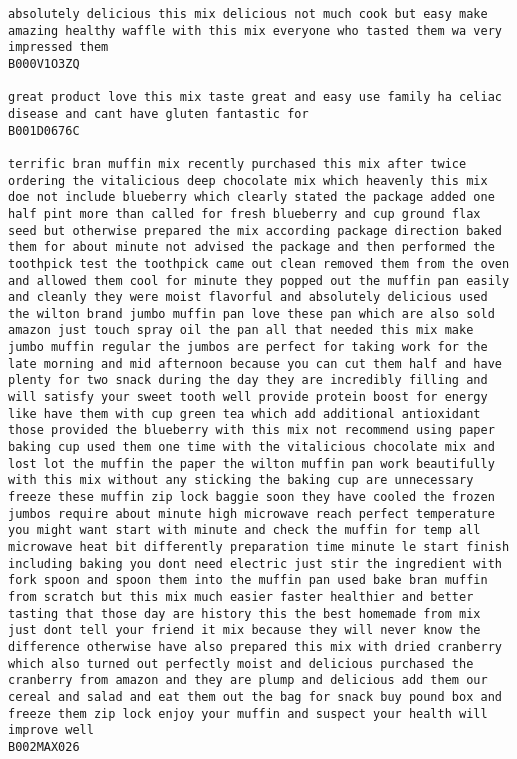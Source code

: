 \documentclass[11pt]{article}
\begin{document}
\begin{Verbatim}[commandchars=\\\{\}]
absolutely delicious this mix delicious not much cook but easy make amazing healthy waffle with this mix everyone who tasted them wa very impressed them
B000V1O3ZQ

great product love this mix taste great and easy use family ha celiac disease and cant have gluten fantastic for
B001D0676C

terrific bran muffin mix recently purchased this mix after twice ordering the vitalicious deep chocolate mix which heavenly this mix doe not include blueberry which clearly stated the package added one half pint more than called for fresh blueberry and cup ground flax seed but otherwise prepared the mix according package direction baked them for about minute not advised the package and then performed the toothpick test the toothpick came out clean removed them from the oven and allowed them cool for minute they popped out the muffin pan easily and cleanly they were moist flavorful and absolutely delicious used the wilton brand jumbo muffin pan love these pan which are also sold amazon just touch spray oil the pan all that needed this mix make jumbo muffin regular the jumbos are perfect for taking work for the late morning and mid afternoon because you can cut them half and have plenty for two snack during the day they are incredibly filling and will satisfy your sweet tooth well provide protein boost for energy like have them with cup green tea which add additional antioxidant those provided the blueberry with this mix not recommend using paper baking cup used them one time with the vitalicious chocolate mix and lost lot the muffin the paper the wilton muffin pan work beautifully with this mix without any sticking the baking cup are unnecessary freeze these muffin zip lock baggie soon they have cooled the frozen jumbos require about minute high microwave reach perfect temperature you might want start with minute and check the muffin for temp all microwave heat bit differently preparation time minute le start finish including baking you dont need electric just stir the ingredient with fork spoon and spoon them into the muffin pan used bake bran muffin from scratch but this mix much easier faster healthier and better tasting that those day are history this the best homemade from mix just dont tell your friend it mix because they will never know the difference otherwise have also prepared this mix with dried cranberry which also turned out perfectly moist and delicious purchased the cranberry from amazon and they are plump and delicious add them our cereal and salad and eat them out the bag for snack buy pound box and freeze them zip lock enjoy your muffin and suspect your health will improve well
B002MAX026


\end{Verbatim}
\end{document}
